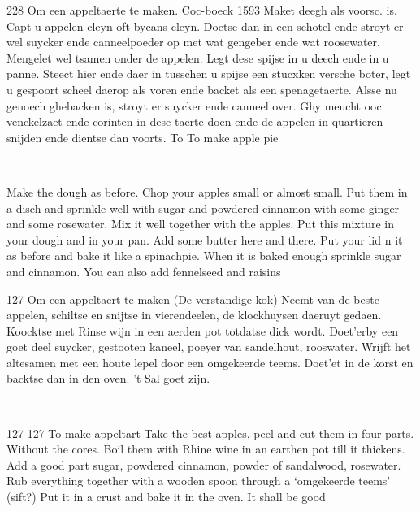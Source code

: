 \documentclass[a4paper]{article}
\begin{document}
\medskip
\begin{minipage}{.45\textwidth}
228 Om een appeltaerte te maken.
Coc-boeck 1593
Maket deegh als voorsc. is. Capt u appelen cleyn oft bycans cleyn. Doetse dan in een schotel ende stroyt er wel suycker ende canneelpoeder op met wat gengeber ende wat roosewater. Mengelet wel tsamen onder de appelen. Legt dese spijse in u deech ende in u panne. Steect hier ende daer in tusschen u spijse een stucxken versche boter, legt u gespoort scheel daerop als voren ende backet als een spenagetaerte. Alsse nu genoech ghebacken is, stroyt er suycker ende canneel over. Ghy meucht ooc venckelzaet ende corinten in dese taerte doen ende de appelen in quartieren snijden ende dientse dan voorts.	To To make apple pie
\end{minipage}
\begin{minipage}{0.05\textwidth}
\ \ \ 
\end{minipage}
\begin{minipage}{.45\textwidth}
Make the dough as before. Chop your apples small or almost small. Put them in a disch and sprinkle well with sugar and powdered cinnamon with some ginger and some rosewater. Mix it well together with the apples. Put this mixture in your dough and in your pan. Add some butter here and there. Put your lid n it as before and bake it like a spinachpie. When it is baked enough sprinkle sugar and cinnamon. You can also add fennelseed and raisins
\end{minipage}

\medskip
\begin{minipage}{.45\textwidth}
127 Om een appeltaert te maken (De verstandige kok)
Neemt van de beste appelen, schiltse en snijtse in vierendeelen, de klockhuysen daeruyt gedaen. Koocktse met Rinse wijn in een aerden pot totdatse dick wordt. Doet'erby een goet deel suycker, gestooten kaneel, poeyer van sandelhout, rooswater. Wrijft het altesamen met een houte lepel door een omgekeerde teems. Doet'et in de korst en backtse dan in den oven. 't Sal goet zijn.	
\end{minipage}
\begin{minipage}{0.05\textwidth}
\ \ \ 
\end{minipage}
\begin{minipage}{.45\textwidth}
127 127 To make appeltart
Take  the best apples, peel and cut them in four parts. Without the cores. Boil them with Rhine wine in an earthen pot till it thickens. Add a good part sugar, powdered cinnamon, powder of sandalwood, rosewater.
Rub everything together with a wooden spoon through a ‘omgekeerde teems’ (sift?)
Put it in a crust and bake it in the oven. It shall be good
\end{minipage}
\end{document}
